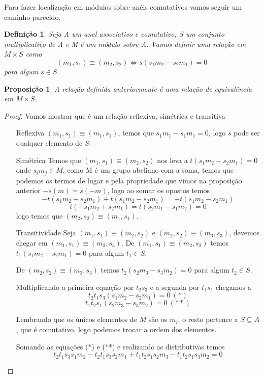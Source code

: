 \documentclass[10pt,a4paper]{article}
\newtheorem{proposition}[theorem]{Proposição}
\newtheorem{definition}[theorem]{Definição}
\begin{document}
Para fazer localização em módulos sobre anéis comutativos vamos seguir um caminho parecido.

\begin{definition}
	Seja A um anel associativo e comutativo, S um conjunto multiplicativo de A e M é um módulo sobre A. Vamos definir uma relação em $M \times S$ como $$(m_1,s_1) \equiv (m_2, s_2) \Leftrightarrow s(s_1m_2-s_2m_1)=0$$ para algum  $s \in S$.
\end{definition}

\begin{proposition}
	A relação definida anteriormente é uma relação de equivalência em $M \times S$.
\end{proposition}

\begin{proof} Vamos mostrar que é um relação reflexiva, simétrica e transitiva
	\begin{enumerate}
		\item [Reflexiva]  $(m_1,s_1) \equiv (m_1, s_1)$, temos que $s_1m_1-s_1m_1=0$, logo $s$ pode ser qualquer elemento de $S$.
		
		
		\item [Simétrica] Temos que $(m_1,s_1) \equiv (m_2, s_2)$ nos leva a $t(s_1m_2-s_2m_1)=0$ onde $s_im_j \in M$, como M é um grupo abeliano com a soma, temos que podemos os termos de lugar e pela propriedade que vimos na proposição anterior $-s(m)=s(-m)$, logo ao somar os opostos temos $$-t(s_1m_2-s_2m_1)+t(s_1m_2-s_2m_1)=-t(s_1m_2-s_2m_1)$$
		$$t(-s_1m_2+s_2m_1)=t(s_2m_1-s_1m_2)=0$$ logo temos que $(m_2,s_2) \equiv (m_1, s_1)$.
		
		
		\item [Transitividade] Seja $(m_1,s_1) \equiv (m_2,s_2)$ e $(m_2,s_2) \equiv (m_3,s_3)$, devemos chegar em $(m_1,s_1) \equiv (m_3,s_3)$.
		De $(m_1,s_1) \equiv (m_2,s_2)$ temos $t_1(s_1m_2-s_2m_1)=0$ para algum $t_1 \in S$.
		
		De $(m_2,s_2) \equiv (m_3,s_3)$ temos $t_2(s_2m_3-s_3m_2)=0$ para algum $t_2 \in S$.
		
		Multiplicando a primeira equação por $t_2s_3$ e a segunda por $t_1s_1$ chegamos a 
		$$t_2t_1s_3(s_1m_2-s_2m_1)=0 \ (*)$$
		$$t_1t_2s_1(s_2m_3-s_3m_2)=0 \ (**)$$
		
		Lembrando que os únicos elementos de $M$ são os $m_i$, o resto pertence a $S \subseteq A$, que é comutativo, logo podemos trocar a ordem dos elementos.
		
		Somando as equações (*) e (**) e realizando as distributivas temos 
		$$t_2t_1s_3s_1m_2-t_2t_1s_3s_2m_1+t_1t_2s_1s_2m_3-t_1t_2s_1s_3m_2=0$$
		

\end{enumerate}
\end{proof}
\end{document}
